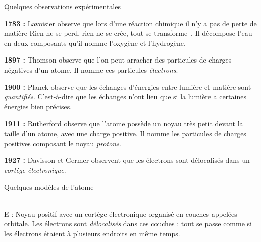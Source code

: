\begin{doc}{Quelques observations expérimentales}
  \label{doc:observations_exp_atome}
  \vspace*{-20pt}
  \begin{listePoints}
    \item \textbf{1783 :} Lavoisier observe que lors d'une réaction chimique il n'y a pas de perte de matière \og Rien ne se perd, rien ne se crée, tout se transforme \fg.
    Il décompose l'eau en deux composants qu'il nomme l'oxygène et l'hydrogène. 
    \item \textbf{1897 :} Thomson observe que l’on peut arracher des particules de charges négatives d’un atome.
    Il nomme ces particules \textit{électrons}.
    \item \textbf{1900 :} Planck observe que les échanges d'énergies entre lumière et matière sont \textit{quantifiés}.
    C'est-à-dire que les échanges n'ont lieu que si la lumière a certaines énergies bien précises.
    \item \textbf{1911 :} Rutherford observe que l'atome possède un noyau très petit devant la taille d’un atome, avec une charge positive.
    Il nomme les particules de charges positives composant le noyau \textit{protons}.
    \item \textbf{1927 :} Davisson et Germer observent que les électrons sont délocalisés dans un \textit{cortège électronique}.
  \end{listePoints}
\end{doc}

\begin{doc}{Quelques modèles de l'atome}
  \label{doc:modeles_atomes}
  \vspace*{18pt}
  
  \centering
   \\
  E : Noyau positif avec un cortège électronique organisé en couches appelées orbitale.
  Les électrons sont \textit{délocalisés} dans ces couches : tout se passe comme si les électrons étaient à plusieurs endroits en même temps.
\end{doc}


